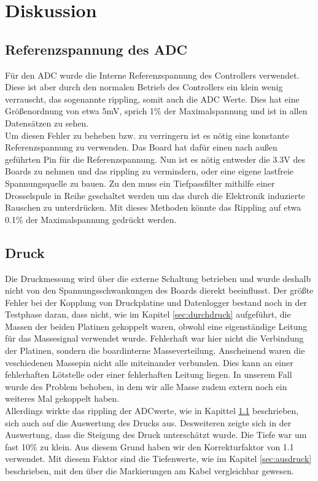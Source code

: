 \documentclass[12pt,a4paper,titlepage,headinclude,bibtotoc]{scrartcl}
\numberwithin{equation}{subsection}
\begin{document}
\section{Diskussion}
\label{sec:diskussion}

\subsection{Referenzspannung des ADC}
\label{sec:diskreffADC}
Für den ADC wurde die Interne Referenzspannung des Controllers verwendet.
Diese ist aber durch den normalen Betrieb des Controllers ein klein wenig verrauscht, das sogenannte rippling, somit auch die ADC Werte.
Dies hat eine Größenordnung von etwa 5\si{\milli\volt}, sprich 1\% der Maximalspannung und ist in allen Datensätzen zu sehen.\\
Um diesen Fehler zu beheben bzw. zu verringern ist es nötig eine konstante Referenzspannung zu verwenden.
Das Board hat dafür einen nach außen geführten Pin für die Referenzspannung.
Nun ist es nötig entweder die 3.3\si{\volt} des Boards zu nehmen und das rippling zu vermindern, oder eine eigene lastfreie Spannungsquelle zu bauen.
Zu den muss ein Tiefpassfilter mithilfe einer Drosselspule in Reihe geschaltet werden um das durch die Elektronik induzierte Rauschen zu unterdrücken.
Mit dieses Methoden könnte das Rippling auf etwa 0.1\% der Maximalspannung gedrückt werden.

\subsection{Druck}
Die Druckmessung wird über die externe Schaltung betrieben und wurde deshalb nicht von den Spannungsschwankungen des Boards dierekt beeinflusst.
Der größte Fehler bei der Kopplung von Druckplatine und Datenlogger bestand noch in der Testphase daran, dass nicht, wie im Kapitel \ref{sec:durchdruck} aufgeführt, die Massen der beiden Platinen gekoppelt waren, obwohl eine eigenständige Leitung für das Massesignal verwendet wurde.
Fehlerhaft war hier nicht die Verbindung der Platinen, sondern die boardinterne Masseverteilung.
Anscheinend waren die veschiedenen Massepin nicht alle miteinander verbunden.
Dies kann an einer fehlerhaften Lötstelle oder einer fehlerhaften Leitung liegen.
In unserem Fall wurde des Problem behoben, in dem wir alle Masse zudem extern noch ein weiteres Mal gekoppelt haben.\\
Allerdings wirkte das rippling der ADCwerte, wie in Kapittel \ref{sec:diskreffADC} beschrieben, sich auch auf die Auswertung des Drucks aus.
Desweiteren zeigte sich in der Auswertung, dass die Steigung des Druck unterschätzt wurde.
Die Tiefe war um fast 10\% zu klein.
Aus diesem Grund haben wir den Korrekturfaktor von 1.1 verwendet.
Mit diesem Faktor sind die Tiefenwerte, wie im Kapitel \ref{sec:ausdruck} beschrieben, mit den über die Markierungen am Kabel vergleichbar gewesen.
\end{document}
